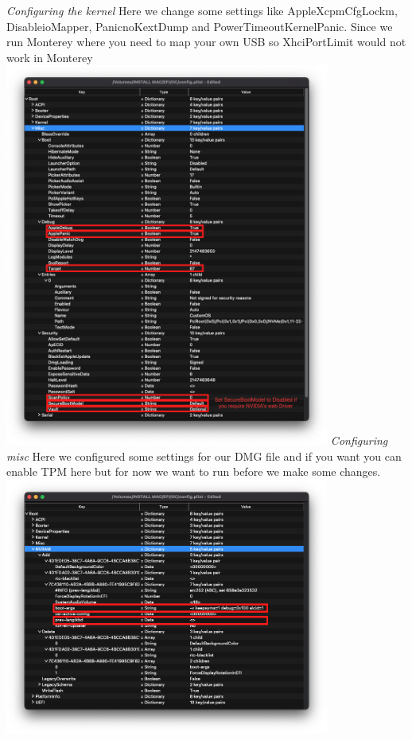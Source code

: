 \documentclass[12pt, letterpaper]{article}
\begin{document}
\break
\emph{Configuring the kernel}
\hfill\break
\hfill\break
Here we change some settings like AppleXcpmCfgLockm, DisableioMapper, PanicnoKextDump and PowerTimeoutKernelPanic. Since we run Monterey where you need to map your own USB so XhciPortLimit would not work in Monterey
\hfill\break
\hfill\break
\includegraphics[width=0.8\textwidth]{fotos/PSP/Propertree/Misc.png}
\break
\emph{Configuring misc}
\hfill\break
\hfill\break
Here we configured some settings for our DMG file and if you want you can enable TPM here but for now we want to run before we make some changes.
\hfill\break
\hfill\break
\includegraphics[width=0.8\textwidth]{fotos/PSP/Propertree/Nvram.png}
\end{document}
